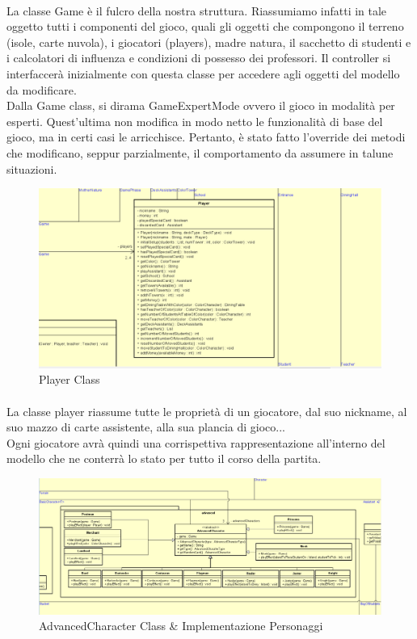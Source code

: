 \documentclass[a4paper, 12pt]{article}
\begin{document}
	\paragraph{}
	La classe Game è il fulcro della nostra struttura. Riassumiamo infatti in tale oggetto tutti i componenti del gioco, quali gli oggetti che compongono il terreno (isole, carte nuvola), i giocatori (players), madre natura, il sacchetto di studenti e i calcolatori di influenza e condizioni di possesso dei professori. Il controller si interfaccerà inizialmente con questa classe per accedere agli oggetti del modello da modificare.\\
	Dalla Game class, si dirama GameExpertMode ovvero il gioco in modalità per esperti. Quest'ultima non modifica in modo netto le funzionalità di base del gioco, ma in certi casi le arricchisce. Pertanto, è stato fatto l'override dei metodi che modificano, seppur parzialmente, il comportamento da assumere in talune situazioni.
	\newpage
	\begin{figure}[h!]
		\centering
		\includegraphics[scale=0.5]{player class.png}
		\caption{Player Class}
	\end{figure}
	\paragraph{}
	La classe player riassume tutte le proprietà di un giocatore, dal suo nickname, al suo mazzo di carte assistente, alla sua plancia di gioco...\\
	Ogni giocatore avrà quindi una corrispettiva rappresentazione all'interno del modello che ne conterrà lo stato per tutto il corso della partita.\\
	\begin{figure}[h!]
		\centering
		\includegraphics[scale=0.5]{advanced class.png}
		\caption{AdvancedCharacter Class \& Implementazione Personaggi}
	\end{figure}
\end{document}
